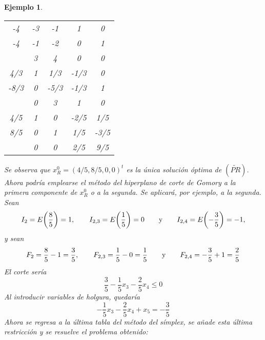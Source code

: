 \documentclass[11pt]{report}
\theoremstyle{mytheorem}
\theoremstyle{mydefinition}
\theoremstyle{myexample}
\newtheorem*{example}{Ejemplo}
\begin{document}
\begin{example}
\begin{center}
\begin{tabular}{|c|c|c|c|c|}
    -4 & \multicolumn{1}{c}{-3} & \multicolumn{1}{c}{-1} & \multicolumn{1}{c}{\phantom{-}1} & \multicolumn{1}{c|}{\phantom{-}0} \\

    -4 & \multicolumn{1}{c}{-1} & \multicolumn{1}{c}{-2} & \multicolumn{1}{c}{\phantom{-}0} & \multicolumn{1}{c|}{\phantom{-}1} \\ \cline{1-5}
    
    \multicolumn{1}{c|}{} & \multicolumn{1}{c}{\phantom{-}3} & \multicolumn{1}{c}{\phantom{-}4} & \multicolumn{1}{c}{\phantom{-}0} & \multicolumn{1}{c|}{\phantom{-}0} \\ \hhline{|=|=|=|=|=|}

    \phantom{-}4/3 & \multicolumn{1}{c}{\phantom{-}1} & \multicolumn{1}{c}{\phantom{-}1/3} & \multicolumn{1}{c}{-1/3} & \multicolumn{1}{c|}{\phantom{-}0} \\

    -8/3 & \multicolumn{1}{c}{\phantom{-}0} & \multicolumn{1}{c}{-5/3} & \multicolumn{1}{c}{-1/3} & \multicolumn{1}{c|}{\phantom{-}1} \\ \cline{1-5}
    
    \multicolumn{1}{c|}{} & \multicolumn{1}{c}{\phantom{-}0} & \multicolumn{1}{c}{\phantom{-}3} & \multicolumn{1}{c}{\phantom{-}1} & \multicolumn{1}{c|}{\phantom{-}0} \\ \hhline{|=|=|=|=|=|}

    \phantom{-}4/5 & \multicolumn{1}{c}{\phantom{-}1} & \multicolumn{1}{c}{\phantom{-}0} & \multicolumn{1}{c}{-2/5} & \multicolumn{1}{c|}{\phantom{-}1/5} \\

    \phantom{-}8/5 & \multicolumn{1}{c}{\phantom{-}0} & \multicolumn{1}{c}{\phantom{-}1} & \multicolumn{1}{c}{\phantom{-}1/5} & \multicolumn{1}{c|}{-3/5} \\ \cline{1-5}
    
    \multicolumn{1}{c|}{} & \multicolumn{1}{c}{\phantom{-}0} & \multicolumn{1}{c}{\phantom{-}0} & \multicolumn{1}{c}{\phantom{-}2/5} & \multicolumn{1}{c|}{\phantom{-}9/5} \\ \cline{2-5}
    
\end{tabular}
\end{center}
Se observa que $x^0_R  = (4/5,8/5,0,0)^t$ es la única solución óptima de $(\widetilde{PR})$. Ahora podría emplearse el método del hiperplano de corte de Gomory a la primera componente de $x^0_R$ o a la segunda. Se aplicará, por ejemplo, a la segunda. Sean
\[I_2 = E\biggl(\frac{8}{5}\biggr) = 1, \qquad I_{2,3} = E\biggl(\frac{1}{5}\biggr)=0 \qquad \textup{y} \qquad I_{2,4} = E\biggl(-\frac{3}{5}\biggr) = -1,\]
y sean
\[F_2 = \frac{8}{5}-1 = \frac{3}{5}, \qquad F_{2,3} = \frac{1}{5}-0=\frac{1}{5} \qquad \textup{y} \qquad F_{2,4} = -\frac{3}{5}+1 = \frac{2}{5}\]
El corte sería
\[\frac{3}{5}-\frac{1}{5}x_3-\frac{2}{5}x_4 \leq 0\]
Al introducir variables de holgura, quedaría
\[-\frac{1}{5}x_3-\frac{2}{5}x_4+x_5=-\frac{3}{5}\]
Ahora se regresa a la última tabla del método del símplex, se añade esta última restricción y se resuelve el problema obtenido:


\end{example}
\end{document}

